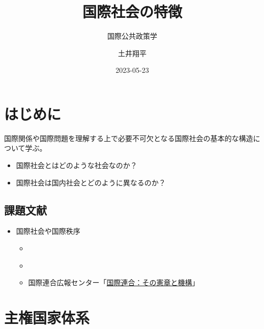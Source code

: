 \documentclass[
  xelatex,
  ja=standard]{bxjsarticle}
\title{国際社会の特徴}
\subtitle{国際公共政策学}
\author{土井翔平}
\date{2023-05-23}
\providecommand{\tightlist}{%
  \setlength{\itemsep}{0pt}\setlength{\parskip}{0pt}}\usepackage{longtable,booktabs,array}
\begin{document}
\maketitle
\ifdefined\Shaded\renewenvironment{Shaded}{\begin{tcolorbox}[borderline west={3pt}{0pt}{shadecolor}, interior hidden, frame hidden, boxrule=0pt, breakable, enhanced, sharp corners]}{\end{tcolorbox}}\fi

\hypertarget{ux306fux3058ux3081ux306b}{%
\section*{はじめに}\label{ux306fux3058ux3081ux306b}}

国際関係や国際問題を理解する上で必要不可欠となる国際社会の基本的な構造について学ぶ。

\begin{itemize}
\tightlist
\item
  国際社会とはどのような社会なのか？
\item
  国際社会は国内社会とどのように異なるのか？
\end{itemize}

\hypertarget{ux8ab2ux984cux6587ux732e}{%
\subsection*{課題文献}\label{ux8ab2ux984cux6587ux732e}}

\begin{itemize}
\tightlist
\item
  国際社会や国際秩序

  \begin{itemize}
  \tightlist
  \item
    \citet[第3章]{nakanishi2013}
  \item
    \citet{shinoda2007}
  \item
    国際連合広報センター「\href{https://www.unic.or.jp/info/un/}{国際連合：その憲章と機構}」
  \end{itemize}
\end{itemize}

\hypertarget{ux4e3bux6a29ux56fdux5bb6ux4f53ux7cfb}{%
\section{主権国家体系}\label{ux4e3bux6a29ux56fdux5bb6ux4f53ux7cfb}}
\end{document}
